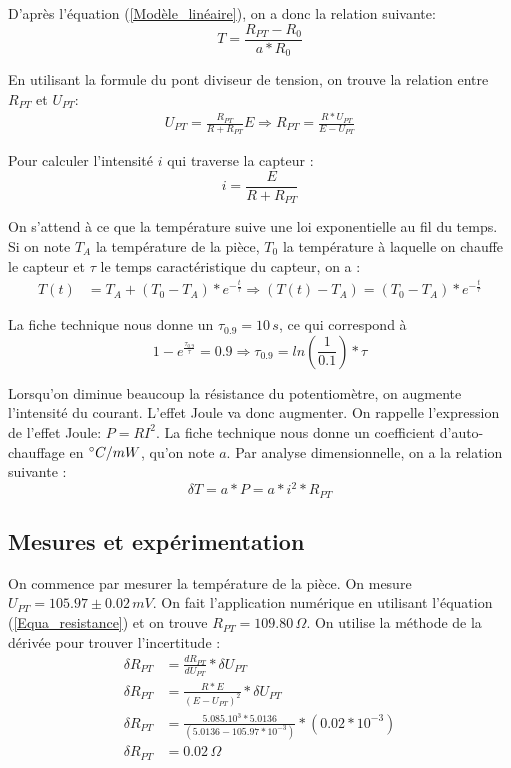 \documentclass[12pt]{article}
\begin{document}
D'après l'équation (\ref{Modèle_linéaire}), on a donc la relation suivante:
\begin{equation}
T=\frac{R_{PT}-R_0}{a*R_0}
\label{Equation_température}
\end{equation}

En utilisant la formule du pont diviseur de tension, on trouve la relation entre $R_{PT}$ et $U_{PT}$:
\begin{align}
U_{PT}=\frac{R_{PT}}{R+R_{PT}}E \Rightarrow R_{PT}=\frac{R*U_{PT}}{E-U_{PT}}
\label{Equa_resistance}
\end{align}

Pour calculer l'intensité $i$ qui traverse la capteur : 
\begin{equation}
i=\frac{E}{R+R_{PT}}
\label{Equa_intensité}
\end{equation}

On s'attend à ce que la température suive une loi exponentielle au fil du temps. Si on note $T_A$ la température de la pièce, $T_0$ la température à laquelle on chauffe le capteur et $\tau$ le temps caractéristique du capteur, on a :
\begin{align}
T(t)&=T_A+(T_0-T_A)*e^{-\frac{t}{\tau}}\Rightarrow
(T(t)-T_A)=(T_0-T_A)*e^{-\frac{t}{\tau}}
\label{exponentielle}
\end{align}   

La fiche technique nous donne un $\tau_{0.9}=10\, s$, ce qui correspond à 
\begin{equation}
1-e^{\frac{\tau_{0.9}}{\tau}}=0.9 \Rightarrow \tau_{0.9}=ln(\frac{1}{0.1})*\tau
\label{Equa_tempsréponse}
\end{equation}

Lorsqu'on diminue beaucoup la résistance du potentiomètre, on augmente l'intensité du courant. L'effet Joule va donc augmenter. On rappelle l'expression de l'effet Joule: $P=RI^2$. La fiche technique nous donne un coefficient d'auto-chauffage en $\degree C/mW$, qu'on note $a$. Par analyse dimensionnelle, on a la relation suivante :
\begin{equation}
\delta T=a*P=a*i^2*R_{PT}
\label{Equation_puissance}
\end{equation}



\subsection{Mesures et expérimentation}

On commence par mesurer la température de la pièce. On mesure $U_{PT}=105.97\pm 0.02\, mV$. On fait l'application numérique en utilisant l'équation (\ref{Equa_resistance}) et on trouve $R_{PT}=109.80\, \Omega$. On utilise la méthode de la dérivée pour trouver l'incertitude :
\begin{align*}
\delta R_{PT}&=\frac{dR_{PT}}{dU_{PT}}*\delta U_{PT} \\
\delta R_{PT}&=\frac{R*E}{(E-U_{PT})^2}*\delta U_{PT} \\
\delta R_{PT}&=\frac{5.085.10^{3}*5.0136}{(5.0136-105.97*10^{-3})}*(0.02*10^{-3})\\
\delta R_{PT}&=0.02\, \Omega
\end{align*}
\end{document}
